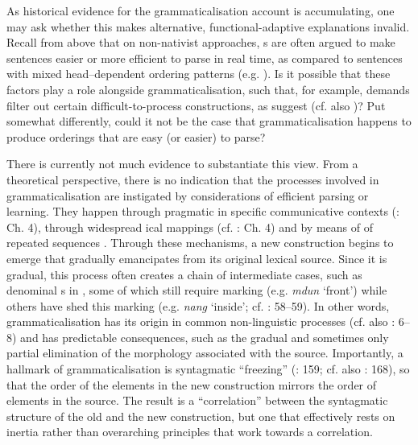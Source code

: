 \documentclass[output=paper]{langsci/langscibook}
\begin{document}
As historical evidence for the grammaticalisation account is accumulating, one may ask whether this makes alternative, functional-adaptive explanations invalid. Recall from above that on non-nativist approaches, s are often argued to make sentences easier or more efficient to parse in real time, as compared to sentences with mixed head–dependent ordering patterns (e.g. \citealt{Hawkins2004}). Is it possible that these factors play a role alongside grammaticalisation, such that, for example,  demands filter out certain difficult-to-process constructions, as \citet{KirbyHurford1997} suggest (cf. also \citealt{Christiansen2000})? Put somewhat differently, could it not be the case that grammaticalisation happens to produce orderings that are easy (or easier) to parse?

There is currently not much evidence to substantiate this view. From a theoretical perspective, there is no indication that the processes involved in grammaticalisation are instigated by considerations of efficient parsing or learning. They happen through pragmatic  in specific communicative contexts (\citealt{HopperTraugott2003}: Ch. 4), through widespread ical mappings (cf. \citealt{Deutscher2005}: Ch. 4) and by means of  of repeated sequences \citep{Bybee2002}. Through these mechanisms, a new construction begins to emerge that gradually emancipates from its original lexical source. Since it is gradual, this process often creates a chain of intermediate cases, such as denominal s in , some of which still require  marking (e.g. \textit{mdun} ‘front’) while others have shed this marking (e.g. \textit{nang} ‘inside’; cf. \citealt{DeLancey1997}: 58–59). In other words, grammaticalisation has its origin in common non-linguistic processes (cf. also \citealt{Bybee2010}: 6–8) and has predictable consequences, such as the gradual and sometimes only partial elimination of the morphology associated with the source. Importantly, a hallmark of grammaticalisation is syntagmatic “freezing” (\citealt{Croft2000}: 159; cf. also \citealt{Lehmann2015}: 168), so that the order of the elements in the new construction mirrors the order of elements in the source. The result is a “correlation” between the syntagmatic structure of the old and the new construction, but one that effectively rests on inertia rather than overarching  principles that work towards a correlation.
\end{document}
